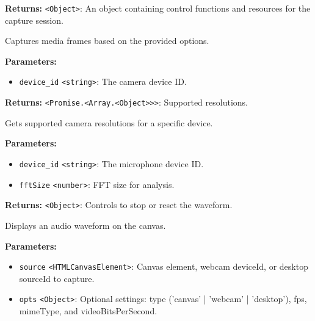 \documentclass[12pt,a4paper]{article}
\begin{document}
\noindent \textbf{Returns:} \texttt{<Object>}: An object containing control functions and resources for the capture session.

\noindent Captures media frames based on the provided options.

\vspace{5mm}
\noindent {}


\noindent \textbf{Parameters:}
\begin{itemize}
  \item \texttt{device\_id} \texttt{<string>}: The camera device ID.
\end{itemize}

\noindent \textbf{Returns:} \texttt{<Promise.<Array.<Object>>>}: Supported resolutions.

\noindent Gets supported camera resolutions for a specific device.

\vspace{5mm}
\noindent {}


\noindent \textbf{Parameters:}
\begin{itemize}
  \item \texttt{device\_id} \texttt{<string>}: The microphone device ID.
  \item \texttt{fftSize} \texttt{<number>}: FFT size for analysis.
\end{itemize}

\noindent \textbf{Returns:} \texttt{<Object>}: Controls to stop or reset the waveform.

\noindent Displays an audio waveform on the canvas.

\vspace{5mm}
\noindent {}


\noindent \textbf{Parameters:}
\begin{itemize}
  \item \texttt{source} \texttt{<HTMLCanvasElement>}: Canvas element, webcam deviceId, or desktop sourceId to capture.
  \item \texttt{opts} \texttt{<Object>}: Optional settings: type ('canvas' | 'webcam' | 'desktop'), fps, mimeType, and videoBitsPerSecond.
\end{itemize}
\end{document}
